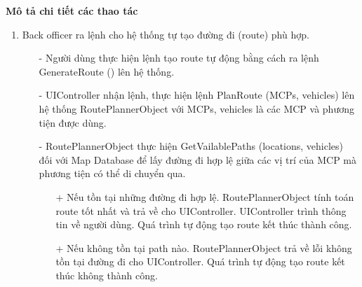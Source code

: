         \textbf{Mô tả chi tiết các thao tác}
        \begin{enumerate}
            \item Back officer ra lệnh cho hệ thống tự tạo đường đi (route) phù hợp.
            \begin{itemize}
                \item[-] Người dùng thực hiện lệnh tạo route tự động bằng cách ra lệnh GenerateRoute () lên hệ thống.
                \item[-] UIController nhận lệnh, thực hiện lệnh PlanRoute (MCPs, vehicles) lên hệ thống RoutePlannerObject với MCPs, vehicles là các MCP và phương tiện được dùng.
                \item[-] RoutePlannerObject thực hiện GetVailablePaths (locations, vehicles) đối với Map Database để lấy đường đi hợp lệ giữa các vị trí của MCP mà phương tiện có thể di chuyển qua.
                \begin{itemize}
                    \item[+] Nếu tồn tại những đường đi hợp lệ. RoutePlannerObject tính toán route tốt nhất và trả về cho UIController. UIController trình thông tin về người dùng. Quá trình tự động tạo route kết thúc thành công.
                    \item[+] Nếu không tồn tại path nào. RoutePlannerObject trả về lỗi không tồn tại đường đi cho UIController. Quá trình tự động tạo route kết thúc không thành công.
                \end{itemize}
            \end{itemize}


\end{enumerate}
